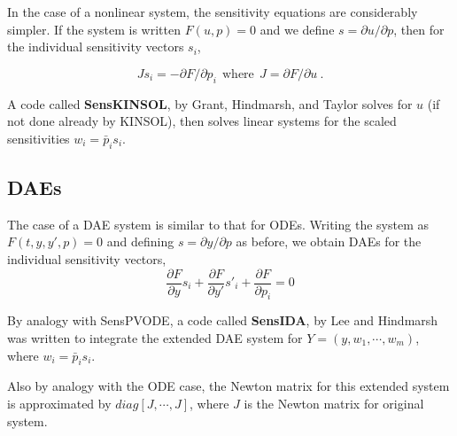 In the case of a nonlinear system, the sensitivity equations are
considerably simpler.  If the system is written $F(u,p) = 0$ and we
define $s = \partial u / \partial p$, then for the individual
sensitivity vectors $s_i$,

\[ J s_i = -\partial F / \partial p_i ~~\mbox{where} ~~
          J = \partial F / \partial u ~. \]

A code called {\bf SensKINSOL}, by Grant, Hindmarsh, and Taylor
\cite{GHT:03} solves for $u$ (if not done already by KINSOL), then
solves linear systems for the scaled sensitivities $w_i = \bar{p}_i s_i$.


\subsection{DAEs}

The case of a DAE system is similar to that for ODEs.  Writing the
system as $F(t,y,y',p) = 0$ and defining $s = \partial y / \partial p$
as before, we obtain DAEs for the individual sensitivity vectors,
\[ \frac{\partial F}{\partial y} s_i + \frac{\partial F}{\partial y'} s'_i
                                 + \frac{\partial F}{\partial p_i}  = 0 \]

By analogy with SensPVODE, a code called {\bf SensIDA}, by Lee and
Hindmarsh was written to integrate the extended DAE system for
$Y = (y,w_1,\cdots,w_m)$, where $w_i = \bar{p}_i s_i$.

Also by analogy with the ODE case, the Newton matrix for this extended
system is approximated by $diag[J,\cdots,J]$, where $J$ is the Newton
matrix for original system.


